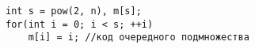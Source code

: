 \documentclass{article}
\begin{document}
\lstset{language = C, extendedchars = \true, keepspaces = true}
\begin{lstlisting}
int s = pow(2, n), m[s];
for(int i = 0; i < s; ++i)
	m[i] = i; //код очередного подмножества
\end{lstlisting}
\end{document}
